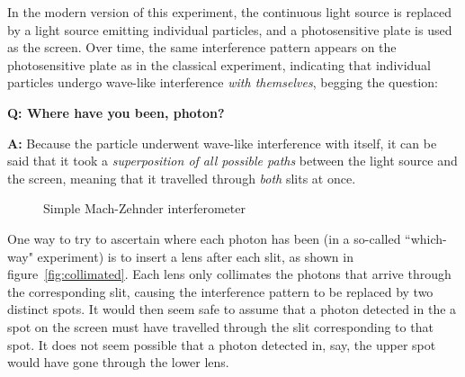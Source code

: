 \documentclass{article}
\newcommand{\Q}{\bfseries Q: }
\newcommand{\A}{\par\textbf{A:} \normalfont}
\begin{document}
In the modern version of this experiment, the continuous light source is 
replaced by a light source emitting individual particles, and a photosensitive 
plate is used as the screen. Over time, the same interference pattern appears 
on the photosensitive plate as in the classical experiment, indicating that 
individual particles undergo wave-like interference \textit{with themselves}, 
begging the question: 

\begin{framed}
\Q Where have you been, photon?  

\A Because the particle underwent wave-like interference with itself, it can be 
said that it took a \textit{superposition of all possible paths} between the 
light source and the screen, meaning that it travelled through \textit{both} 
slits at once\cite{lundeen}.  \footnotemark \end{framed}


\begin{figure}[h]
	\centering
	
	\caption{Simple Mach-Zehnder interferometer}
	\label{fig:interferometer1}
\end{figure}

One way to try to ascertain where each photon has been (in a so-called 
``which-way" experiment) is to insert a lens after each slit, as shown in 
figure~\ref{fig:collimated}\cite{bohr,lundeen}. Each lens only collimates the 
photons that arrive through the corresponding slit, causing the interference 
pattern to be replaced by two distinct spots. It would then seem safe to assume 
that a photon detected in the a spot on the screen must have travelled through 
the slit corresponding to that spot. It does not seem possible that a photon 
detected in, say, the upper spot would have gone through the lower lens. 
\end{document}
